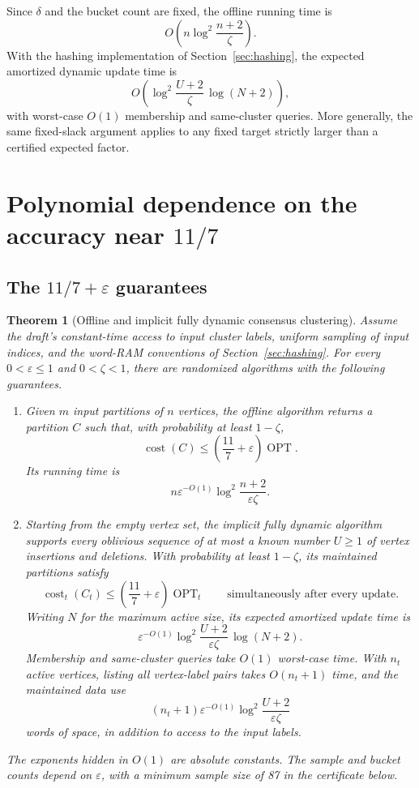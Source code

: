 \documentclass[11pt]{article}
\newtheorem{theorem}{Theorem}[section]
\begin{document}
Since $\delta$ and the bucket count are fixed, the offline running time is
\[
 O\!\left(n\log^2\frac{n+2}{\zeta}\right).
\]
With the hashing implementation of Section~\ref{sec:hashing}, the
expected amortized dynamic update time is
\[
 O\!\left(\log^2\frac{U+2}{\zeta}\,\log(N+2)\right),
\]
with worst-case $O(1)$ membership and same-cluster queries. More
generally, the same fixed-slack argument applies to any fixed target
strictly larger than a certified expected factor.

\section{Polynomial dependence on the accuracy near \texorpdfstring{$11/7$}{11/7}}
\label{sec:centered-poly}

\subsection{The \texorpdfstring{$11/7+\varepsilon$}{11/7 + epsilon} guarantees}

\begin{theorem}[Offline and implicit fully dynamic consensus clustering]
\label{thm:eleven-sevenths}
Assume the draft's constant-time access to input cluster labels,
uniform sampling of input indices, and the word-RAM conventions of
Section~\ref{sec:hashing}. For every
$0<\varepsilon\le1$ and $0<\zeta<1$, there are randomized algorithms
with the following guarantees.
\begin{enumerate}
\item Given $m$ input partitions of $n$ vertices, the offline algorithm
returns a partition $C$ such that, with probability at least $1-\zeta$,
\[
 \operatorname{cost}(C)
 \le\left(\frac{11}{7}+\varepsilon\right)\operatorname{OPT}.
\]
Its running time is
\[
 n\varepsilon^{-O(1)}
       \log^2\frac{n+2}{\varepsilon\zeta}.
\]
\item Starting from the empty vertex set, the implicit fully dynamic
algorithm supports every oblivious sequence of at most a known number
$U\ge1$ of vertex insertions and deletions. With probability at least
$1-\zeta$, its maintained partitions satisfy
\[
 \operatorname{cost}_t(C_t)
 \le\left(\frac{11}{7}+\varepsilon\right)\operatorname{OPT}_t
 \qquad\text{simultaneously after every update}.
\]
Writing $N$ for the maximum active size, its expected amortized update
time is
\[
 \varepsilon^{-O(1)}
       \log^2\frac{U+2}{\varepsilon\zeta}\,\log(N+2).
\]
Membership and same-cluster queries take $O(1)$ worst-case time.
With $n_t$ active vertices, listing all vertex-label pairs takes
$O(n_t+1)$ time, and the maintained data use
\[
 (n_t+1)\varepsilon^{-O(1)}
       \log^2\frac{U+2}{\varepsilon\zeta}
\]
words of space, in addition to access to the input labels.
\end{enumerate}
The exponents hidden in $O(1)$ are absolute constants. The sample and
bucket counts depend on $\varepsilon$, with a minimum sample size of
87 in the certificate below.
\end{theorem}
\end{document}
